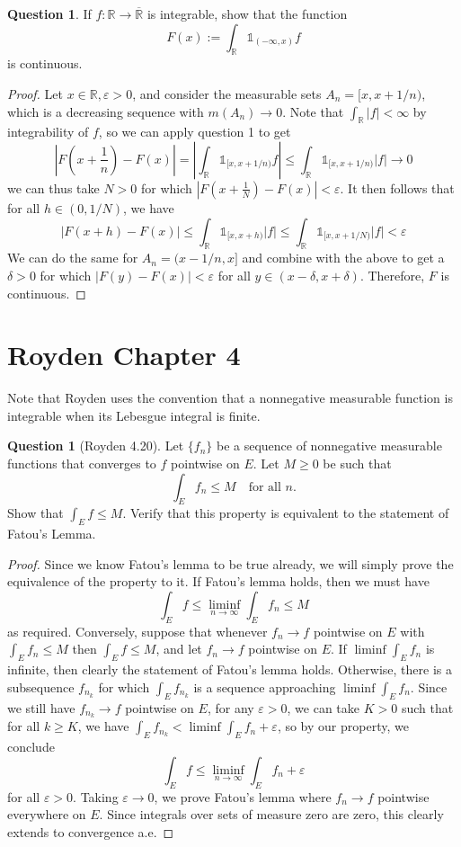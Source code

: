 \documentclass{article}
\newcommand{\R}{\mathbb{R}}
\theoremstyle{definition} %
\numberwithin{thm}{section} %
\theoremstyle{definition} %
\newtheorem{question}[thm]{Question}
\begin{document}
\begin{question}
If $f : \mathbb{R} \to \overline{\mathbb{R}}$ is integrable, show that the function
\[
F(x) := \int_{\mathbb{R}} \mathds{1}_{(-\infty, x)} f
\]
is continuous.
\end{question}
\begin{proof}
Let $x \in \R, \varepsilon > 0$, and consider the measurable sets $A_n = [x, x + 1/n)$, which is a decreasing sequence with $m(A_n) \to 0$. Note that $\int_\R |f| < \infty$ by integrability of $f$, so we can apply question 1 to get 
\[ \left|F\left(x + \frac{1}{n}\right) - F(x)\right| = \left|\int_\R \mathds{1}_{[x, x + 1/n)} f\right| \leq \int_\R \mathds{1}_{[x, x + 1/n)} |f| \to 0 \]
we can thus take $N > 0$ for which $\left|F\left(x + \frac{1}{N}\right) - F(x)\right| < \varepsilon$. It then follows that for all $h \in (0, 1/N)$, we have 
\[ \left|F\left(x + h\right) - F(x)\right| \leq \int_\R \mathds{1}_{[x, x + h)} |f| \leq \int_\R \mathds{1}_{[x, x + 1/N)} |f| < \varepsilon \]
We can do the same for $A_n = (x - 1/n, x]$ and combine with the above to get a $\delta > 0$ for which $\left|F(y) - F(x)\right| < \varepsilon$ for all $y \in (x - \delta, x + \delta)$. Therefore, $F$ is continuous.
\end{proof}

\section{Royden Chapter 4}

Note that Royden uses the convention that a nonnegative measurable function is integrable when its Lebesgue integral is finite.

\begin{question}[Royden 4.20]
Let $\{f_n\}$ be a sequence of nonnegative measurable functions that converges to $f$ pointwise on $E$. Let $M \geq 0$ be such that 
\[ \int_E f_n \leq M \quad \text{for all } n. \]
Show that $\int_E f \leq M$. Verify that this property is equivalent to the statement of Fatou's Lemma.
\end{question}
\begin{proof}
Since we know Fatou's lemma to be true already, we will simply prove the equivalence of the property to it. If Fatou's lemma holds, then we must have 
\[ \int_E f \leq \liminf_{n \to \infty} \int_E f_n \leq M \]
as required. Conversely, suppose that whenever $f_n \to f$ pointwise on $E$ with $\int_E f_n \leq M$ then $\int_E f \leq M$, and let $f_n \to f$ pointwise on $E$. If $\liminf \int_E f_n$ is infinite, then clearly the statement of Fatou's lemma holds. Otherwise, there is a subsequence $f_{n_k}$ for which $\int_E f_{n_k}$ is a sequence approaching $\liminf\int_E f_n$. Since we still have $f_{n_k} \to f$ pointwise on $E$, for any $\varepsilon > 0$, we can take $K > 0$ such that for all $k \geq K$, we have $\int_E f_{n_k} < \liminf\int_E f_n + \varepsilon$, so by our property, we conclude
\[ \int_E f \leq \liminf_{n \to \infty} \int_E f_n + \varepsilon \]
for all $\varepsilon > 0$. Taking $\varepsilon \to 0$, we prove Fatou's lemma where $f_n \to f$ pointwise everywhere on $E$. Since integrals over sets of measure zero are zero, this clearly extends to convergence a.e.
\end{proof}
\end{document}
